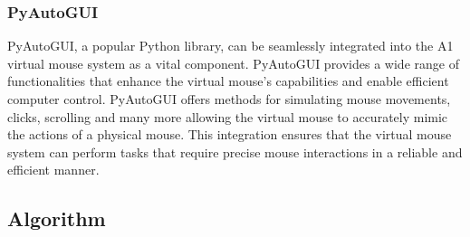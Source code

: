 \documentclass[12pt,a4paper]{report}
\begin{document}
	\subsubsection{PyAutoGUI}
	{
		PyAutoGUI, a popular Python library, can be seamlessly integrated into the A1 virtual mouse system as a vital component. PyAutoGUI provides a wide range of functionalities that enhance the virtual mouse's capabilities and enable efficient computer control. PyAutoGUI offers methods for simulating mouse movements, clicks, scrolling and many more allowing the virtual mouse to accurately mimic the actions of a physical mouse.\cite{r5} This integration ensures that the virtual mouse system can perform tasks that require precise mouse interactions in a reliable and efficient manner. 
	}
	\label{Algorithm }
	\subsection{Algorithm }
\end{document}
